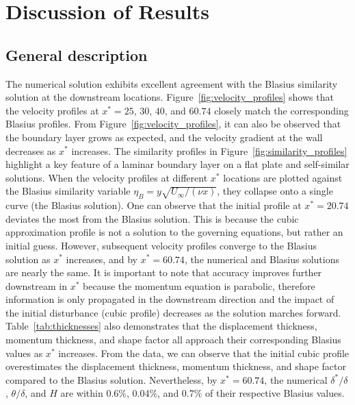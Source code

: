\documentclass[letterpaper,12pt]{article}
\begin{document}

\section{Discussion of Results}
\subsection{General description}

The numerical solution exhibits excellent agreement with the Blasius similarity solution at the downstream locations. Figure~\ref{fig:velocity_profiles} shows that the velocity profiles at $x^* = 25$, $30$, $40$, and $60.74$ closely match the corresponding Blasius profiles. From Figure~\ref{fig:velocity_profiles}, it can also be observed that the boundary layer grows as expected, and the velocity gradient at the wall decreases as $x^*$ increases. The similarity profiles in Figure~\ref{fig:similarity_profiles} highlight a key feature of a laminar boundary layer on a flat plate and self-similar solutions. When the velocity profiles at different $x^*$ locations are plotted against the Blasius similarity variable $\eta_B = y \sqrt{U_\infty/(\nu x)}$, they collapse onto a single curve (the Blasius solution). One can observe that the initial profile at $x^* = 20.74$ deviates the most from the Blasius solution. This is because the cubic approximation profile is not a solution to the governing equations, but rather an initial guess. However, subsequent velocity profiles converge to the Blasius solution as $x^*$ increases, and by $x^* = 60.74$, the numerical and Blasius solutions are nearly the same. It is important to note that accuracy improves further downstream in $x^*$ because the momentum equation is parabolic, therefore information is only propagated in the downstream direction and the impact of the initial disturbance (cubic profile) decreases as the solution marches forward. Table~\ref{tab:thicknesses} also demonstrates that the displacement thickness, momentum thickness, and shape factor all approach their corresponding Blasius values as $x^*$ increases. From the data, we can observe that the initial cubic profile overestimates the displacement thickness, momentum thickness, and shape factor compared to the Blasius solution. Nevertheless, by $x^* = 60.74$, the numerical $\delta^*/\delta$, $\theta/\delta$, and $H$ are within 0.6\%, 0.04\%, and 0.7\% of their respective Blasius values.
\end{document}
